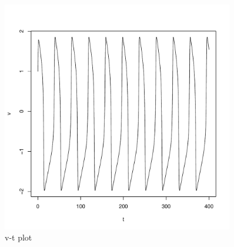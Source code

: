 \documentclass[8pt]{article}\usepackage[]{graphicx}\usepackage[]{color}
\newenvironment{knitrout}{}{} %
\begin{document}
\begin{enumerate}
\begin{knitrout}
\begin{figure}
\includegraphics[width=0.9\textwidth]{figure/fhn1-1} \caption[v-t plot]{v-t plot}\label{fig:fhn1}
\end{figure}



\end{knitrout}
\end{enumerate}
\end{document}
